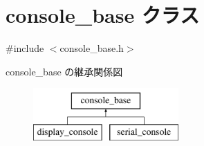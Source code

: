 \hypertarget{classconsole__base}{}\section{console\+\_\+base クラス}
\label{classconsole__base}


{\ttfamily \#include $<$console\+\_\+base.\+h$>$}

console\+\_\+base の継承関係図\begin{figure}[H]
\begin{center}
\leavevmode
\includegraphics[height=2.000000cm]{classconsole__base}
\end{center}
\end{figure}
